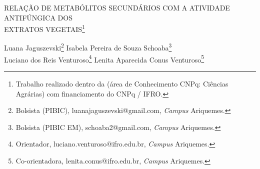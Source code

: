 \documentclass[article,12pt,onesidea,4paper,english,brazil]{abntex2}
\begin{document}
	
	
	\frenchspacing 
	
	\begin{center}
		\LARGE RELAÇÃO DE METABÓLITOS SECUNDÁRIOS COM A ATIVIDADE
		ANTIFÚNGICA DOS\\EXTRATOS VEGETAIS\footnote{Trabalho realizado dentro da (área de Conhecimento CNPq: Ciências Agrárias) com financiamento do CNPq / IFRO.}
		
		\normalsize
		Luana Jaguszevski\footnote{Bolsista (PIBIC), luanajaguszevski@gmail.com, \textit{Campus} Ariquemes.} 
		Isabela Pereira de Souza Schoaba\footnote{Bolsista (PIBIC EM), schoaba2@gmail.com, \textit{Campus} Ariquemes.}\\ 
		Luciano dos Reis Venturoso\footnote{Orientador, luciano.venturoso@ifro.edu.br, \textit{Campus} Ariquemes.} 
		Lenita Aparecida Conus Venturoso\footnote{Co-orientadora, lenita.conus@ifro.edu.br, \textit{Campus} Ariquemes.} 
	\end{center}
	
\end{document}
